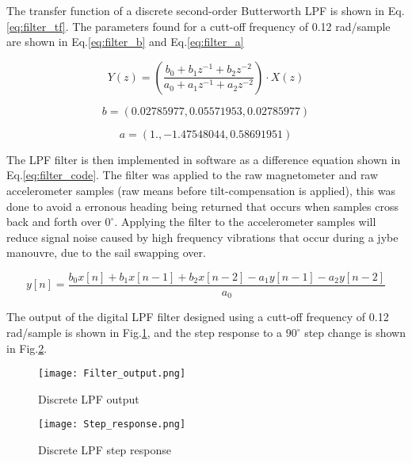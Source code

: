 The transfer function of a discrete second-order Butterworth LPF is shown in Eq.\ref{eq:filter_tf}. The parameters found for a cutt-off frequency of 0.12 rad/sample are shown in 
Eq.\ref{eq:filter_b} and Eq.\ref{eq:filter_a}

\begin{equation}
    \label{eq:filter_tf}
    Y(z) = \left( \frac{b_{0} + b_{1}z^{-1} + b_{2}z^{-2}}{a_{0} + a_{1}z^{-1} + a_{2}z^{-2}} \right) \cdot X(z)
\end{equation}


\begin{equation}
    \label{eq:filter_b}
    b = (0.02785977, 0.05571953, 0.02785977) 
\end{equation}


\begin{equation}
    \label{eq:filter_a}
    a = (1. , -1.47548044, 0.58691951)
\end{equation}

The LPF filter is then implemented in software as a difference equation shown in Eq.\ref{eq:filter_code}. The filter was applied to the raw magnetometer and raw accelerometer samples (raw means 
before tilt-compensation is applied), this was done to avoid a erronous heading being returned that occurs when samples cross back and forth over $0^{\circ}$. Applying
the filter to the accelerometer samples will reduce signal noise caused by high frequency vibrations that occur during a jybe manouvre, due to the sail swapping over.


\begin{equation}
    \label{eq:filter_code}
    y[n] = \frac{b_{0}x[n] + b_{1}x[n-1] + b_{2}x[n-2] - a_{1}y[n-1] - a_{2}y[n-2]}{a_{0}}
\end{equation}


The output of the digital LPF filter designed using a cutt-off frequency of 0.12 rad/sample is shown in Fig.\ref{fig:lpf_output}, and the step response to a $90^{\circ}$ step change is shown in
Fig.\ref{fig:filter_step}.

\begin{figure}[!h]
    \centering
    \texttt{[image: Filter\_output.png]}
    \caption[Digital compass discrete LPF output]{Discrete LPF output}
    \label{fig:lpf_output}
\end{figure}

\begin{figure}[!h]
    \centering
    \texttt{[image: Step\_response.png]}
    \caption[Digital compass discrete LPF step response]{Discrete LPF step response}
    \label{fig:filter_step}
\end{figure}

